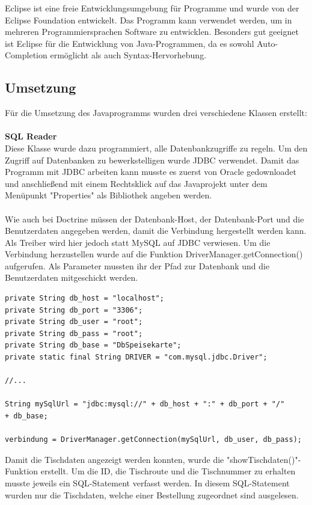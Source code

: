 Eclipse ist eine freie Entwicklungsumgebung für Programme und wurde von der Eclipse Foundation entwickelt. Das Programm kann verwendet werden, um in mehreren Programmiersprachen Software zu entwicklen. Besonders gut geeignet ist Eclipse für die Entwicklung von Java-Programmen, da es sowohl Auto-Completion ermöglicht als auch Syntax-Hervorhebung.

  \subsection{Umsetzung}
Für die Umsetzung des Javaprogramms wurden drei verschiedene Klassen erstellt:\\ \\
\textbf{SQL Reader}\\
Diese Klasse wurde dazu programmiert, alle Datenbankzugriffe zu regeln.
Um den {Zugriff auf Datenbanken zu bewerkstelligen wurde JDBC\cite{jdbctutorial}} verwendet.
Damit das Programm mit JDBC arbeiten kann musste es zuerst von Oracle gedownloadet und anschließend mit einem Rechtsklick auf das Javaprojekt unter dem Menüpunkt "Properties" als Bibliothek angeben werden.
\\ \\
Wie auch bei Doctrine müssen der Datenbank-Host, der Datenbank-Port und die Benutzerdaten angegeben werden, damit die Verbindung hergestellt werden kann.
Als Treiber wird hier jedoch statt MySQL auf JDBC verwiesen.
Um die Verbindung herzustellen wurde auf die Funktion DriverManager.getConnection() aufgerufen. Als Parameter mussten ihr der Pfad zur Datenbank und die Benutzerdaten mitgeschickt werden.
\lstset{language = java}
  	\begin{lstlisting}
private String db_host = "localhost";
private String db_port = "3306";
private String db_user = "root";
private String db_pass = "root";
private String db_base = "DbSpeisekarte";
private static final String DRIVER = "com.mysql.jdbc.Driver";

//...

String mySqlUrl = "jdbc:mysql://" + db_host + ":" + db_port + "/"
+ db_base;

verbindung = DriverManager.getConnection(mySqlUrl, db_user, db_pass);
	\end{lstlisting}
Damit die Tischdaten angezeigt werden konnten, wurde die "showTischdaten()"-Funktion erstellt. Um die ID, die Tischroute und die Tischnummer zu erhalten musste jeweils ein SQL-Statement verfasst werden. In diesem SQL-Statement wurden nur die Tischdaten, welche einer Bestellung zugeordnet sind ausgelesen.
